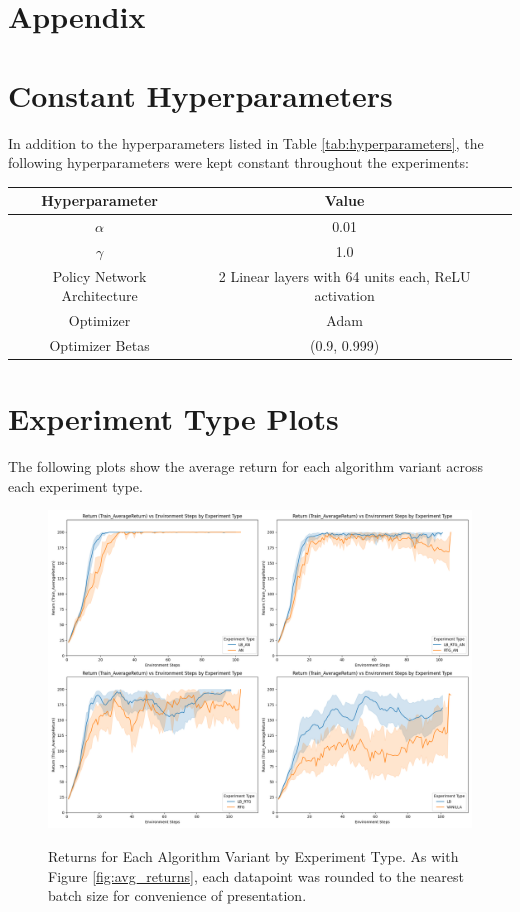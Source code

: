 \documentclass{article} %
\begin{document}



\appendix
\section*{Appendix}
\section{Constant Hyperparameters}
In addition to the hyperparameters listed in Table \ref{tab:hyperparameters}, 
the following hyperparameters were kept constant throughout the experiments:

\begin{tabular}{ccc}
    \toprule
    Hyperparameter & Value \\
    \midrule
    $\alpha$ & 0.01 \\
    $\gamma$ & 1.0 \\
    Policy Network Architecture & 2 Linear layers with 64 units each, ReLU activation \\
    Optimizer & Adam \\
    Optimizer Betas & (0.9, 0.999) \\
    \bottomrule
\end{tabular}

\section{Experiment Type Plots} \label{sec:experiment_type_plots}
The following plots show the average return for each algorithm variant across each experiment type.
\begin{figure}[h]
    \centering
    \captionsetup{justification=centering}
    \includegraphics[width = \linewidth, height = 0.4\textheight]{plots/return-vs-env-steps-all-expt-types.png}
    \label{fig:returns_by_experiment_type}
    \caption{Returns for Each Algorithm Variant by Experiment Type. As with Figure \ref{fig:avg_returns},
    each datapoint was rounded to the nearest batch size for convenience of presentation.}
\end{figure}
\end{document}
